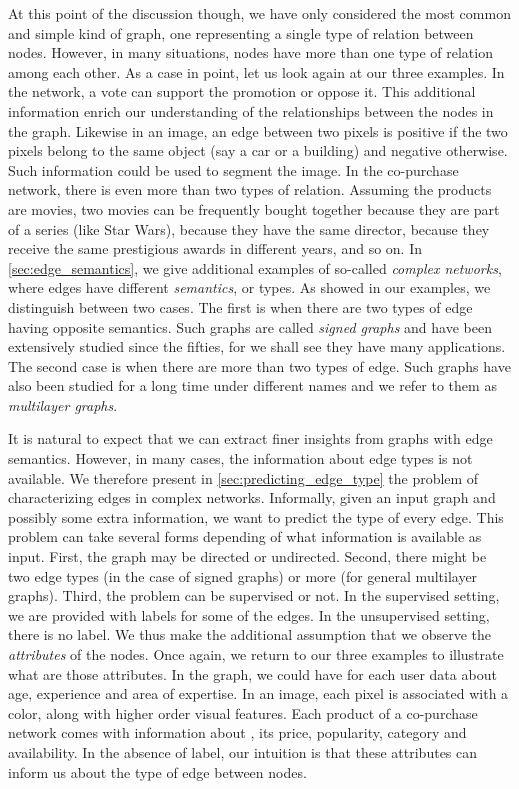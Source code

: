 At this point of the discussion though, we have only considered the most common and simple kind of
graph, one representing a single type of relation between nodes. However, in many situations, nodes
have more than one type of relation among each other. As a case in point, let us look again at our
three examples. In the \wik{} network, a vote can support the promotion or oppose it. This
additional information enrich our understanding of the relationships between the nodes in the graph.
Likewise in an image, an edge between two pixels is positive if the two pixels belong to the same
object (say a car or a building) and negative otherwise. Such information could be used to segment
the image. In the co-purchase network, there is even more than two types of relation. Assuming the
products are movies, two movies can be frequently bought together because they are part of a series
(like Star Wars), because they have the same director, because they receive the same prestigious
awards in different years, and so on. In \autoref{sec:edge_semantics}, we give additional examples
of so-called \emph{complex networks}, where edges have different \emph{semantics}, or types. As
showed in our examples, we distinguish between two cases. The first is when there are two types of
edge having opposite semantics. Such graphs are called \emph{signed graphs} and have been
extensively studied since the fifties, for we shall see they have many applications. The second case
is when there are more than two types of edge. Such graphs have also been studied for a long time
under different names and we refer to them as \emph{multilayer graphs}.

It is natural to expect that we can extract finer insights from graphs with edge semantics. However,
in many cases, the information about edge types is not available. We therefore present in
\autoref{sec:predicting_edge_type} the problem of characterizing edges in complex networks.
Informally, given an input graph and possibly some extra information, we want to predict the type of
every edge. This problem can take several forms depending of what information is available as input.
First, the graph may be directed or undirected. Second, there might be two edge types (in the case of
signed graphs) or more (for general multilayer graphs). Third, the problem can be supervised or not.
In the supervised setting, we are provided with labels for some of the edges. In the unsupervised
setting, there is no label. We thus make the additional assumption that we observe the
\emph{attributes} of the nodes. Once again, we return to our three examples to illustrate what are
those attributes. In the \wik{} graph, we could have for each user data about age, experience and
area of expertise. In an image, each pixel is associated with a color, along with higher order
visual features. Each product of a co-purchase network comes with information about \eg{}, its price,
popularity, category and availability. In the absence of label, our intuition is that these
attributes can inform us about the type of edge between nodes. 


